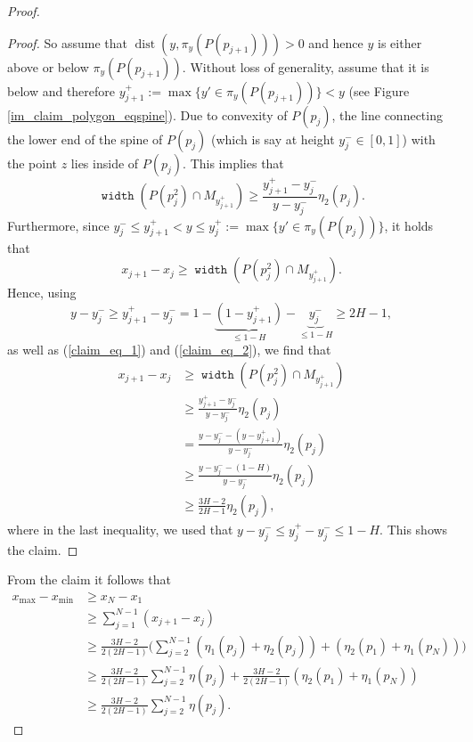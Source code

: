 \documentclass[a4paper,UKenglish,cleveref, autoref, thm-restate]{lipics_v2021}
\DeclareMathOperator{\dist}{dist}
\DeclareMathOperator{\width}{\mathtt{width}}
\begin{document}
\begin{proof}
\begin{proof}
So assume that $\dist(y, \pi_y(P(p_{j+1}))) > 0$ and hence $y$ is either above or below $\pi_y(P(p_{j+1}))$. Without loss of generality, assume that it is below and therefore $y_{j+1}^+ := \max \{y' \in \pi_y(P(p_{j+1}))\} < y$ (see Figure \ref{im_claim_polygon_eqspine}). Due to convexity of $P(p_j)$, the line connecting the lower end of the spine of $P(p_j)$ (which is say at height $y_j^- \in [0,1]$) with the point $z$ lies inside of $P(p_j)$. This implies that
\begin{equation}
\label{claim_eq_1}
\width(P(p_j^2) \cap M_{y_{j+1}^+}) \geq \frac{y_{j+1}^+ - y_j^-}{y-y_j^-} \eta_2(p_j).
\end{equation}
Furthermore, since $y_j^- \leq y_{j+1}^+ < y \leq y_j^+ := \max\{y' \in \pi_y(P(p_{j}))\}$, it holds that
\begin{equation}
\label{claim_eq_2}
x_{j+1}-x_j \geq \width(P(p^2_j) \cap M_{y_{j+1}^+}).
\end{equation}
Hence, using
\[
y-y_j^- \geq y_{j+1}^+ - y_j^- = 1-\underbrace{(1-y_{j+1}^+)}_{\leq 1-H}-\underbrace{y_j^-}_{\leq 1-H} \geq 2H-1,
\]
as well as (\ref{claim_eq_1}) and (\ref{claim_eq_2}), we find that
\begin{align*}
x_{j+1}-x_j &\geq \width(P(p^2_j) \cap M_{y_{j+1}^+}) \\
&\geq \frac{y_{j+1}^+ - y_j^-}{y-y_j^-} \eta_2(p_j) \\
&= \frac{y-y_j^- -(y-y_{j+1}^+)}{y-y_j^-} \eta_2(p_j) \\
&\geq \frac{y-y_j^- -(1-H)}{y-y_j^-} \eta_2(p_j) \\
&\geq \frac{3H-2}{2H-1} \eta_2(p_j),
\end{align*}
where in the last inequality, we used that $y-y_j^- \leq y_j^+ - y_j^- \leq 1-H$. This shows the claim.
\end{proof}

From the claim it follows that
\begin{align*}
x_{\max}-x_{\min} &\geq x_N-x_1 \\
& \geq \sum_{j=1}^{N-1} (x_{j+1}-x_j) \\
& \geq \frac{3H-2}{2(2H-1)} \bigg(\sum_{j=2}^{N-1} (\eta_1(p_j) + \eta_2(p_j)) + (\eta_2(p_1) + \eta_1(p_N))\bigg) \\
& \geq \frac{3H-2}{2(2H-1)}\sum_{j=2}^{N-1} \eta(p_j) + \frac{3H-2}{2(2H-1)} (\eta_2(p_1) + \eta_1(p_N)) \\
& \geq \frac{3H-2}{2(2H-1)}\sum_{j=2}^{N-1} \eta(p_j).
\end{align*}


\end{proof}
\end{document}

